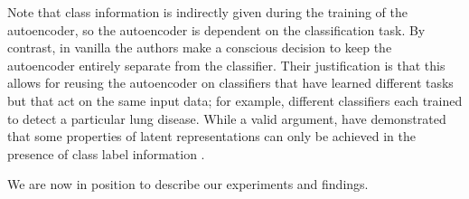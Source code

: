 \documentclass[../main.tex]{subfiles}
\begin{document}
Note that class information is indirectly given during the training of the autoencoder, so the autoencoder is dependent on the classification task.
By contrast, in vanilla \ls{} the authors make a conscious decision to keep the autoencoder entirely separate from the classifier.
Their justification is that this allows for reusing the autoencoder on classifiers that have learned different tasks but that act on the same input data; for example, different classifiers each trained to detect a particular lung disease.
While a valid argument, \citeauthor{locatelloChallenging2019} have demonstrated that some properties of latent representations can only be achieved in the presence of class label information \cite{locatelloChallenging2019}.

We are now in position to describe our experiments and findings.
\end{document}
